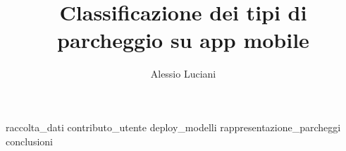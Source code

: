 \documentclass[binding=0.6cm,Lau,noexaminfo]{sapthesis}
\title{Classificazione dei tipi di parcheggio su app mobile} \author{Alessio Luciani}
\begin{document}
\frontmatter
\maketitle
\dedication{Alla mia famiglia}
\tableofcontents
\large

\mainmatter
{raccolta_dati}
{contributo_utente}
{deploy_modelli}
{rappresentazione_parcheggi}
{conclusioni}
\backmatter

\cleardoublepage
{} %


\end{document}
